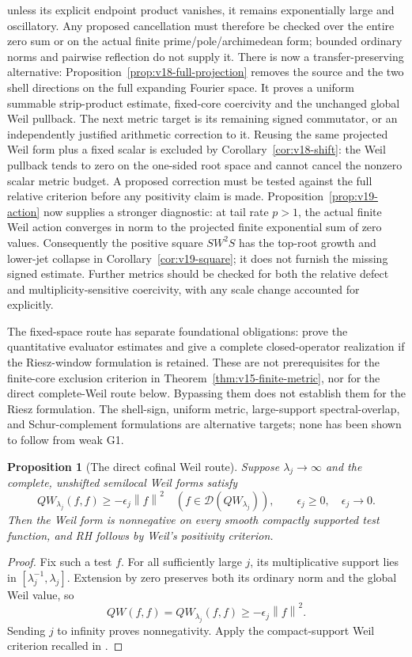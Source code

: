 \documentclass[11pt]{article}
\newtheorem{proposition}[theorem]{Proposition}
\theoremstyle{remark}
\newcommand{\norm}[1]{\left\lVert #1\right\rVert}
\begin{document}
unless its explicit endpoint product vanishes, it remains exponentially
large and oscillatory. Any proposed cancellation must therefore be checked
over the entire zero sum or on the actual finite prime/pole/archimedean
form; bounded ordinary norms and pairwise reflection do not supply it.
There is now a transfer-preserving alternative:
Proposition~\ref{prop:v18-full-projection} removes the source and the
two shell directions on the full expanding Fourier space. It proves a
uniform summable strip-product estimate, fixed-core coercivity and the
unchanged global Weil pullback. The next metric target is its remaining
signed commutator, or an independently justified arithmetic correction
to it. Reusing the same projected Weil form plus a fixed scalar is
excluded by Corollary~\ref{cor:v18-shift}: the Weil pullback tends to
zero on the one-sided root space and cannot cancel the nonzero scalar
metric budget. A proposed correction must be tested against the full
relative criterion before any positivity claim is made.
Proposition~\ref{prop:v19-action} now supplies a stronger diagnostic:
at tail rate $p>1$, the actual finite Weil action converges in norm to
the projected finite exponential sum of zero values. Consequently
the positive square $SW^2S$ has the top-root growth and lower-jet
collapse in Corollary~\ref{cor:v19-square}; it does not furnish the
missing signed estimate. Further metrics should be checked for both
the relative defect and multiplicity-sensitive coercivity, with any
scale change accounted for explicitly.

The fixed-space route has separate foundational obligations: prove the
quantitative evaluator estimates and give a complete closed-operator
realization if the Riesz-window formulation is retained. These are not
prerequisites for the finite-core exclusion criterion in
Theorem~\ref{thm:v15-finite-metric}, nor for the direct complete-Weil
route below. Bypassing them does not establish them for the Riesz
formulation. The shell-sign, uniform metric, large-support
spectral-overlap, and Schur-complement formulations are alternative
targets; none has been shown to follow from weak G1.

\begin{proposition}[The direct cofinal Weil route]\label{prop:v121-cofinal-rh}
Suppose $\lambda_j\to\infty$ and the complete, unshifted semilocal
Weil forms satisfy
\[
 QW_{\lambda_j}(f,f)\ge-\epsilon_j\norm f^2
 \quad(f\in\mathcal D(QW_{\lambda_j})),
 \qquad \epsilon_j\ge0,\quad\epsilon_j\to0.
\]
Then the Weil form is nonnegative on every smooth compactly supported
test function, and RH follows by Weil's positivity criterion.
\end{proposition}
\begin{proof}
Fix such a test $f$. For all sufficiently large $j$, its multiplicative
support lies in $[\lambda_j^{-1},\lambda_j]$. Extension by zero
preserves both its ordinary norm and the global Weil value, so
\[
 QW(f,f)=QW_{\lambda_j}(f,f)\ge-\epsilon_j\norm f^2.
\]
Sending $j$ to infinity proves nonnegativity. Apply the compact-support
Weil criterion recalled in \cite{ConnesConsaniMoscovici2025}.
\end{proof}
\end{document}
